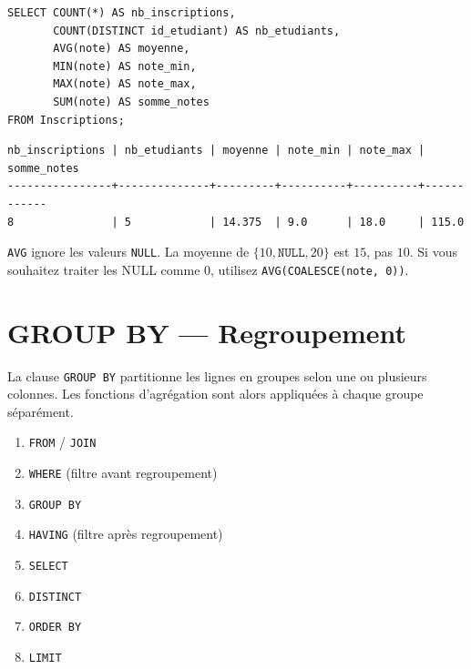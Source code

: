 \begin{codeblock}[title=\textbf{Agr\'egations simples}]
\begin{verbatim}
SELECT COUNT(*) AS nb_inscriptions,
       COUNT(DISTINCT id_etudiant) AS nb_etudiants,
       AVG(note) AS moyenne,
       MIN(note) AS note_min,
       MAX(note) AS note_max,
       SUM(note) AS somme_notes
FROM Inscriptions;
\end{verbatim}
\end{codeblock}

\begin{codeoutput}
\begin{verbatim}
nb_inscriptions | nb_etudiants | moyenne | note_min | note_max | somme_notes
----------------+--------------+---------+----------+----------+------------
8               | 5            | 14.375  | 9.0      | 18.0     | 115.0
\end{verbatim}
\end{codeoutput}

\begin{attention}[title=\textbf{AVG et les valeurs NULL}]
\texttt{AVG} ignore les valeurs \texttt{NULL}. La moyenne de $\{10, \texttt{NULL}, 20\}$
est $15$, pas $10$. Si vous souhaitez traiter les NULL comme $0$, utilisez
\texttt{AVG(COALESCE(note, 0))}.
\end{attention}

\section{GROUP BY --- Regroupement}

\begin{definition}[GROUP BY]
La clause \texttt{GROUP BY} partitionne les lignes en groupes selon une ou
plusieurs colonnes. Les fonctions d'agr\'egation sont alors appliqu\'ees
\`a chaque groupe s\'epar\'ement.
\end{definition}

\begin{formules}[title=\textbf{Ordre d'ex\'ecution avec GROUP BY}]
\begin{enumerate}
    \item \texttt{FROM} / \texttt{JOIN}
    \item \texttt{WHERE} (filtre avant regroupement)
    \item \texttt{GROUP BY}
    \item \texttt{HAVING} (filtre apr\`es regroupement)
    \item \texttt{SELECT}
    \item \texttt{DISTINCT}
    \item \texttt{ORDER BY}
    \item \texttt{LIMIT}
\end{enumerate}
\end{formules}

